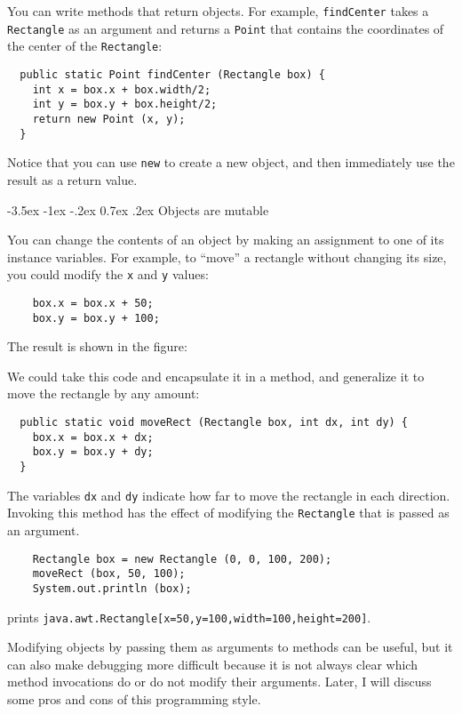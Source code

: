 \documentclass{book}
\makeatletter
\renewcommand{\section}{\@startsection 
    {section} {1} {0mm}%
    {-3.5ex \@plus -1ex \@minus -.2ex}%
    {0.7ex \@plus.2ex}%
    {\normalfont\Large\bfseries}}
\newcommand{\beforefig}{\vspace{1.3\parskip}}
\newcommand{\afterfig}{\vspace{-0.2\parskip}}
\newcommand{\myfig}[1]{
    \beforefig
    \centerline{\epsfig{#1,scale=0.8}}
    \afterfig
}
\makeatother
\begin{document}
You can write methods that return objects.  For example,
{\tt findCenter} takes a {\tt Rectangle} as an argument and
returns a {\tt Point} that contains the coordinates of the
center of the {\tt Rectangle}:

\begin{verbatim}
  public static Point findCenter (Rectangle box) {
    int x = box.x + box.width/2;
    int y = box.y + box.height/2;
    return new Point (x, y);
  }
\end{verbatim}
%
Notice that you can use {\tt new} to create a new object,
and then immediately use the result as a return value.

\section{Objects are mutable}

You can change the contents of an object by making an assignment
to one of its instance variables.  For example, to ``move''
a rectangle without changing its size, you could modify the
{\tt x} and {\tt y} values:

\begin{verbatim}
    box.x = box.x + 50;
    box.y = box.y + 100;
\end{verbatim}
%
The result is shown in the figure:


\myfig{figure=figs/rectangle2.eps}



We could take this code and encapsulate it in a method, and
generalize it to move the rectangle by any amount:

\begin{verbatim}
  public static void moveRect (Rectangle box, int dx, int dy) {
    box.x = box.x + dx;
    box.y = box.y + dy;
  }
\end{verbatim}
%
The variables {\tt dx} and {\tt dy} indicate how far to move the
rectangle in each direction.  Invoking this method has the effect of
modifying the {\tt Rectangle} that is passed as an argument.

\begin{verbatim}
    Rectangle box = new Rectangle (0, 0, 100, 200);
    moveRect (box, 50, 100);
    System.out.println (box);
\end{verbatim}
%
prints {\tt java.awt.Rectangle[x=50,y=100,width=100,height=200]}.

Modifying objects by passing them as arguments to methods can be
useful, but it can also make debugging more difficult because it is
not always clear which method invocations do or do not modify their
arguments.  Later, I will discuss some pros and cons of this
programming style.
\end{document}
